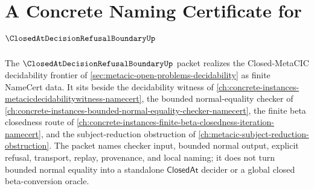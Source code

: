 \chapter{A Concrete Naming Certificate for $\ClosedAtDecisionRefusalBoundaryUp$}
\label{ch:concrete-instances-closedat-decision-refusal-boundary-namecert}

The $\ClosedAtDecisionRefusalBoundaryUp$ packet realizes the Closed-MetaCIC decidability frontier of \autoref{sec:metacic-open-problems-decidability} as finite NameCert data. It sits beside the decidability witness of \autoref{ch:concrete-instances-metacicdecidabilitywitness-namecert}, the bounded normal-equality checker of \autoref{ch:concrete-instances-bounded-normal-equality-checker-namecert}, the finite beta closedness route of \autoref{ch:concrete-instances-finite-beta-closedness-iteration-namecert}, and the subject-reduction obstruction of \autoref{ch:metacic-subject-reduction-obstruction}. The packet names checker input, bounded normal output, explicit refusal, transport, replay, provenance, and local naming; it does not turn bounded normal equality into a standalone $\mathsf{ClosedAt}$ decider or a global closed beta-conversion oracle.

